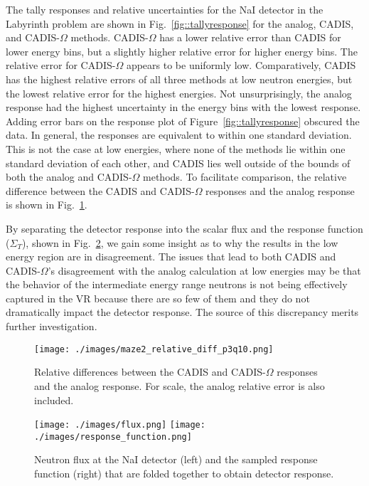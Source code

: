 \documentclass[12pt]{article}
\begin{document}
The tally responses and relative uncertainties for the NaI detector in the Labyrinth problem are shown in Fig.~\ref{fig::tallyresponse} for the analog, CADIS, and CADIS-$\Omega$ methods.  CADIS-$\Omega$ has a lower relative error than CADIS for lower energy bins, but a slightly higher relative error for higher energy bins. The relative error for CADIS-$\Omega$ appears to be uniformly low. Comparatively, CADIS has the highest relative errors of all three methods at low neutron energies, but the lowest relative error for the highest energies. Not unsurprisingly, the analog response had the highest uncertainty in the energy bins with the lowest response. Adding error bars on the response plot of Figure~\ref{fig::tallyresponse} obscured the data. In general, the responses are equivalent to within one standard deviation. This is not the case at low energies, where none of the methods lie within one standard deviation of each other, and CADIS lies well outside of the bounds of both the analog and CADIS-$\Omega$ methods. 
To facilitate comparison, the relative difference between the CADIS and CADIS-$\Omega$ responses and the analog response is shown in Fig.~\ref{fig::rediffs}. 

By separating the detector response into the scalar flux and the response function ($\Sigma_{T}$), shown in Fig.~\ref{fig::tallyproducts}, we gain some insight as to why the results in the low energy region are in disagreement.
The issues that lead to both CADIS and CADIS-$\Omega$'s disagreement with the analog calculation at low energies may be that the behavior of the intermediate energy range neutrons is not being effectively captured in the VR because there are so few of them and they do not dramatically impact the detector response. 
The source of this discrepancy merits further investigation. 
\begin{figure}
  \begin{center}
    \texttt{[image: ./images/maze2\_relative\_diff\_p3q10.png]}
    \caption[]{\label{fig::rediffs} Relative differences between the CADIS and CADIS-$\Omega$ responses and the analog response. For scale, the analog relative error is also included. }
  \end{center}
\end{figure}
\begin{figure}
  \begin{center}
    \texttt{[image: ./images/flux.png]}
    \texttt{[image: ./images/response\_function.png]}
    \caption[]{\label{fig::tallyproducts} Neutron flux at the NaI detector (left) and the sampled response function (right) that are folded together to obtain detector response. }
  \end{center}
\end{figure}
\end{document}
